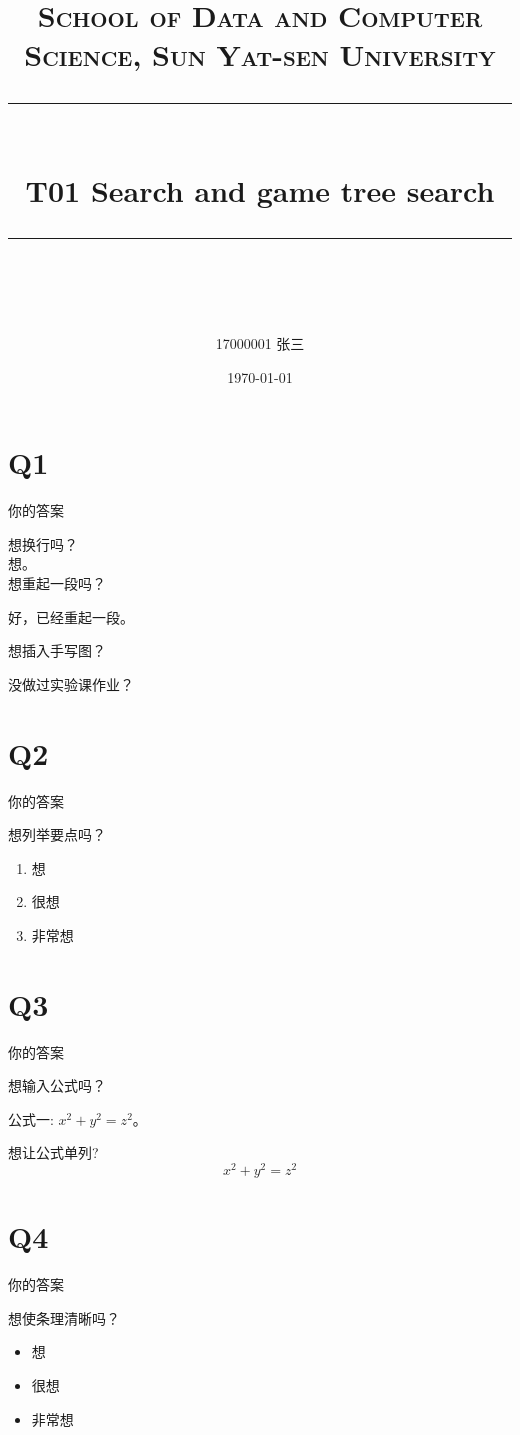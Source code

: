 \documentclass[a4paper, 11pt]{article}
\title{	
\normalfont \normalsize
\textsc{School of Data and Computer Science, Sun Yat-sen University} \\ [25pt] %
\rule{\textwidth}{0.5pt} \\[0.4cm] %
\huge  T01 Search and game tree search\\ %
\rule{\textwidth}{2pt} \\[0.5cm] %
\author{17000001 张三}
\date{\normalsize\today}
}
\begin{document}
\maketitle
\tableofcontents
\newpage
\section{Q1}
你的答案

想换行吗？\\
想。\\
想重起一段吗？

好，已经重起一段。

想插入手写图？

没做过实验课作业？
\section{Q2}
你的答案


想列举要点吗？

\begin{enumerate}
\item 想
\item 很想
\item 非常想
\end{enumerate}
\section{Q3}
你的答案

想输入公式吗？

公式一: $x^2+y^2=z^2$。

想让公式单列?
$$x^2+y^2=z^2$$
\section{Q4}
你的答案

想使条理清晰吗？

\begin{itemize}
\item 想
\item 很想
\item 非常想
\end{itemize}

%
%
\end{document}
